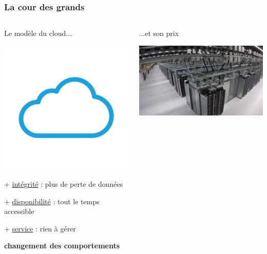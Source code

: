 \documentclass[aspectratio=169]{beamer}
\begin{document}
\begin{frame}[t]
	\frametitle{La cour des grands}

	\begin{columns}[t]
	\begin{column}{0.5\textwidth}
		{\huge Le modèle du cloud...}
	 
	\begin{center}
		\includegraphics[scale=0.08]{img/cloud.png}
	\end{center}
	
		+ \underline{intégrité} : plus de perte de données
	
		+ \underline{disponibilité} : tout le temps accessible
		
		+ \underline{service} : rien à gérer
	
		\vspace{0.15cm}
		\textbf{changement des comportements}
	\end{column}
	\pause
	\begin{column}{0.5\textwidth}
		{\huge ...et son prix}
	 
	\begin{center}
		\includegraphics[scale=0.07]{img/dc.jpg}
	\end{center}
	

\end{column}
\end{columns}
\end{frame}
\end{document}
